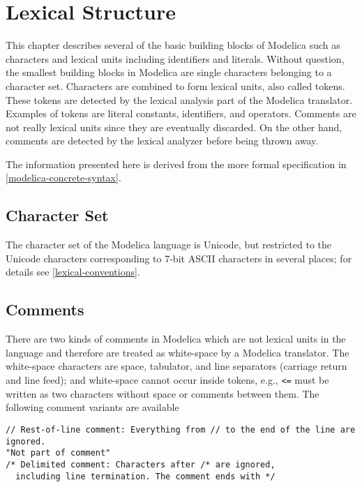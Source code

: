 \chapter{Lexical Structure}\label{lexical-structure}

This chapter describes several of the basic building blocks of Modelica
such as characters and lexical units including identifiers and literals.
Without question, the smallest building blocks in Modelica are single
characters belonging to a character set. Characters are combined to form
lexical units, also called tokens. These tokens are detected by the
lexical analysis part of the Modelica translator. Examples of tokens are
literal constants, identifiers, and operators. Comments are not really
lexical units since they are eventually discarded. On the other hand,
comments are detected by the lexical analyzer before being thrown away.

The information presented here is derived from the more formal
specification in \cref{modelica-concrete-syntax}.

\section{Character Set}\label{character-set}

The character set of the Modelica language is Unicode, but restricted to
the Unicode characters corresponding to 7-bit ASCII characters in
several places; for details see \cref{lexical-conventions}.

\section{Comments}\label{comments}

There are two kinds of comments in Modelica which are not lexical units in the language and therefore are treated as white-space by a Modelica translator.
The white-space characters are space, tabulator, and line separators (carriage return and line feed); and white-space cannot occur inside tokens, e.g., \lstinline!<=! must be written as two characters without space or comments between them.
The following comment variants are available
\begin{lstlisting}[language=modelica]
// Rest-of-line comment: Everything from // to the end of the line are ignored.
"Not part of comment"
/* Delimited comment: Characters after /* are ignored,
  including line termination. The comment ends with */
\end{lstlisting}

